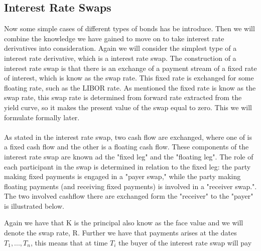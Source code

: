 \subsection{Interest Rate Swaps}
Now some simple cases of different types of bonds has be introduce. Then we will combine the knowledge we have gained to move on
to take interest rate derivatives into consideration. Again we will consider the simplest type of a interest rate derivative, which is a
interest rate swap. The construction of a interest rate swap is that there is an  exchange of a payment stream of a fixed rate of interest,
which is know as the swap rate. This fixed rate is exchanged for some floating rate, such as the LIBOR rate. 
As mentioned the fixed rate is know as the swap rate, this swap rate is determined from forward rate extracted from the yield curve, 
so it makes the present value of the swap equal to zero. This we will formulate formally later. 
\\\\
As stated in the interest rate swap, two cash flow are exchanged, where one of is a 
fixed cash flow and the other is a floating cash flow. These components of
the interest rate swap are known ad the "fixed leg" and the "floating leg". 
The role of each participant in the swap is determined in relation to the 
fixed leg: the party making fixed payments is engaged in a "payer swap," 
while the party making floating payments (and receiving fixed payments) is
involved in a "receiver swap.". The two involved cashflow there are exchanged form the "receiver" to the "payer" is illustrated below.
\\
\begin{center}
\end{center} 
\noindent
Again we have that K is the principal also know as the face value and we will denote the swap rate, R.
Further we have that payments
arises at the dates $T_1,...,T_n$, this means that at time $T_i$ the buyer of the interest rate swap will pay
